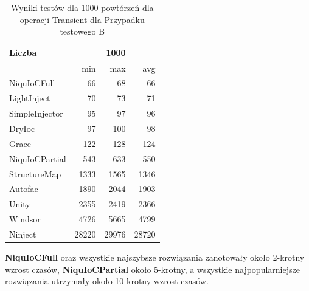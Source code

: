 \documentclass[12pt]{article}
\begin{document}
\begin{table}[H]
\captionsetup{belowskip=0pt,aboveskip=0pt}
\begin{center}
\begin{small}
	\begin{tabular}{ | l | r r r | }
    		\hline
Liczba & & 1000 & \\ \hline
 & min & max & avg \\ \hline
NiquIoCFull & 66 & 68 & 66 \\ \hline
LightInject & 70 & 73 & 71 \\ \hline
SimpleInjector & 95 & 97 & 96 \\ \hline
DryIoc & 97 & 100 & 98 \\ \hline
Grace & 122 & 128 & 124 \\ \hline
NiquIoCPartial & 543 & 633 & 550 \\ \hline
StructureMap & 1333 & 1565 & 1346 \\ \hline
Autofac & 1890 & 2044 & 1903 \\ \hline
Unity & 2355 & 2419 & 2366 \\ \hline
Windsor & 4726 & 5665 & 4799 \\ \hline
Ninject & 28220 & 29976 & 28720 \\ \hline
  	\end{tabular}
\end{small}
\end{center}
\caption{Wyniki testów dla 1000 powtórzeń dla operacji Transient dla Przypadku testowego B}
\label{TestCaseB_Transient1000}
\end{table}
\textbf{NiquIoCFull} oraz wszystkie najszybsze rozwiązania zanotowały około 2-krotny wzrost czasów, \textbf{NiquIoCPartial} około 5-krotny, a wszystkie najpopularniejsze rozwiązania utrzymały około 10-krotny wzrost czasów.
\end{document}
